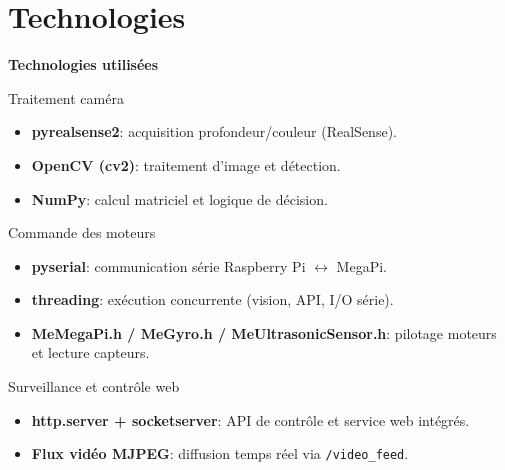 \documentclass[10pt,aspectratio=169]{beamer}
\begin{document}
\section{Technologies}

\begin{frame}{\textbf{Technologies utilisées}}

\begin{block}{Traitement caméra}

\begin{itemize}
    \item \textbf{pyrealsense2}: acquisition profondeur/couleur (RealSense).
    \item \textbf{OpenCV (cv2)}: traitement d’image et détection.
    \item \textbf{NumPy}: calcul matriciel et logique de décision.
\end{itemize}

\end{block}

\begin{block}{Commande des moteurs}

\begin{itemize}
    \item \textbf{pyserial}: communication série Raspberry Pi $\leftrightarrow$ MegaPi.
    \item \textbf{threading}: exécution concurrente (vision, API, I/O série).
    \item \textbf{MeMegaPi.h / MeGyro.h / MeUltrasonicSensor.h}: pilotage moteurs et lecture capteurs.
\end{itemize}

\end{block}

\begin{block}{Surveillance et contrôle web}

\begin{itemize}
    \item \textbf{http.server + socketserver}: API de contrôle et service web intégrés.
    \item \textbf{Flux vidéo MJPEG}: diffusion temps réel via \texttt{/video\_feed}.
\end{itemize}

\end{block}

\end{frame}
\end{document}
